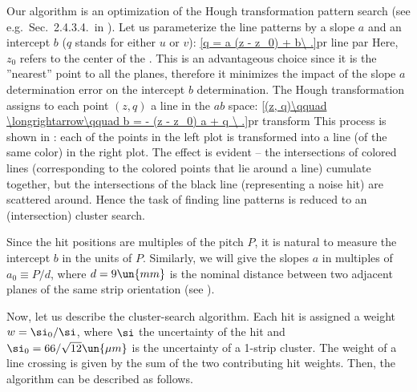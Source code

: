 Our algorithm is an optimization of the Hough transformation pattern search (see e.g.~Sec.~2.4.3.4.~in ). Let us parameterize the line patterns by a slope $a$ and an intercept $b$ ($q$ stands for either $u$ or $v$):
\eqref{q = a (z - z_0) + b\ .}{pr line par}
Here, $z_0$ refers to the center of the . This is an advantageous choice since it is the ''nearest'' point to all the planes, therefore it minimizes the impact of the slope $a$ determination error on the intercept $b$ determination. The Hough transformation assigns to each point $(z, q)$ a line in the $ab$ space:
\eqref{(z, q)\qquad \longrightarrow\qquad b = - (z - z_0) a + q \ .}{pr transform}
This process is shown in : each of the points in the left plot is transformed into a line (of the same color) in the right plot. The effect is evident -- the intersections of colored lines (corresponding to the colored points that lie around a line) cumulate together, but the intersections of the black line (representing a noise hit) are scattered around. Hence the task of finding line patterns is reduced to an (intersection) cluster search.

Since the hit positions are multiples of the pitch $P$, it is natural to measure the intercept $b$ in the units of $P$. Similarly, we will give the slopes $a$ in multiples of $a_0 \equiv P / d$, where $d = 9 \un{mm}$ is the nominal distance between two adjacent planes of the same strip orientation (see ).


Now, let us describe the cluster-search algorithm. Each hit is assigned a weight $w = \si_0/\si$, where $\si$ the uncertainty of the hit and $\si_0 = 66/\sqrt{12} \un{\mu m}$ is the uncertainty of a 1-strip cluster. The weight of a line crossing is given by the sum of the two contributing hit weights. Then, the algorithm can be described as follows.

